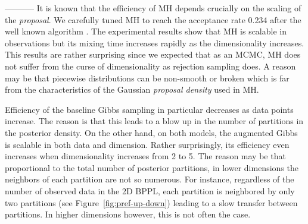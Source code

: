 -----------
It is known that the efficiency of MH depends crucially on the scaling of the 
\emph{proposal}.
We carefully tuned MH to reach the acceptance rate 0.234 after the well known algorithm \cite{Roberts:97}. 
The experimental results show that MH is scalable in observations but its mixing time increases rapidly as the dimensionality increases. 
This results are rather surprising since we expected that as an MCMC, MH does not suffer from the curse of dimensionality as rejection sampling does. 
A reason may be that piecewise distributions can be non-smooth or broken which is far from the characteristics of the Gaussian \emph{proposal density} used in MH. 


Efficiency of the baseline Gibbs sampling in particular decreases as data points increase.
The reason is that this leads to a blow up in the number of partitions in the posterior density.
On the other hand, on both models, the augmented Gibbs is scalable in both data 
and dimension. 
Rather surprisingly, its efficiency even increases when dimensionality increases from 2 to 5.
The reason may be that proportional to the total number of posterior partitions, in lower dimensions the neighbors of each partition are not so numerous. 
For instance, regardless of the number of observed data in the 2D BPPL, each partition is neighbored by only two partitions (see Figure~\ref{fig:pref-up-down}) leading to a slow transfer between partitions. 
In higher dimensions however, this is not often the case.
